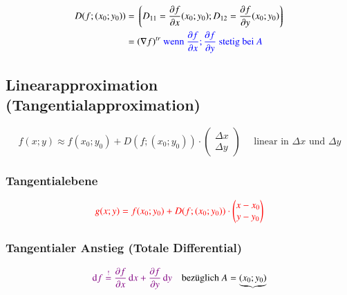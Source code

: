 \[
    \begin{split}
        D(f;(x_{0}; y_{0})) &= \left\lgroup D_{11} = \frac{\partial f}{\partial x}(x_{0}; y_{0}); D_{12} = \frac{\partial f}{\partial y}(x_{0}; y_{0})\right\rgroup\\
        &= (\nabla f)^{tr} \text{ {\color{blue}wenn $\frac{\partial f}{\partial x}; \frac{\partial f}{\partial y}$ stetig bei $A$}}
    \end{split}
\]



\subsection{Linearapproximation (Tangentialapproximation)}
\[
    f(x;y) \approx f(x_{0}; y_{0}) + D(f;(x_{0}; y_{0}))\cdot \begin{pmatrix}
        \Delta x\\
        \Delta y
    \end{pmatrix}
    \quad\text{ linear in $\Delta x$ und $\Delta y$}
\]


\subsubsection{Tangentialebene}
\[
    {\color{red}g(x; y) = f(x_{0}; y_{0}) + D(f;(x_{0}; y_{0}))\cdot \begin{pmatrix}
        x - x_{0}\\
        y - y_{0}
    \end{pmatrix}}
\]


\subsubsection{Tangentialer Anstieg (Totale Differential)}
\[
    \cvt{\diff f \overset{!}{=} 
        \frac{\partial f}{\partial \tikznode{ptx}{x}}\diff x + 
        \frac{\partial f}{\partial \tikznode{pty}{y}}\diff y} 
        \quad \text{bezüglich } A=\underbrace{(x_{0}; y_{0})}_{\tikznode{axy}{}}
\]


